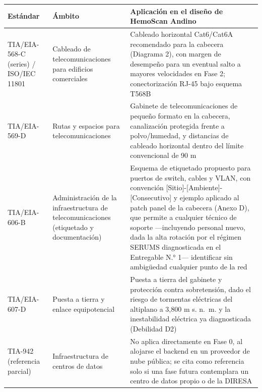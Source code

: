 \documentclass[11pt,a4paper]{article}
\begin{document}
{\small
\begin{longtable}[]{@{}
  >{\raggedright\arraybackslash}p{}
  >{\raggedright\arraybackslash}p{}
  >{\raggedright\arraybackslash}p{}@{}}
\toprule\noalign{}
\begin{minipage}[b]{\linewidth}\raggedright
Estándar
\end{minipage} & \begin{minipage}[b]{\linewidth}\raggedright
Ámbito
\end{minipage} & \begin{minipage}[b]{\linewidth}\raggedright
Aplicación en el diseño de HemoScan Andino
\end{minipage} \\
\midrule\noalign{}
\endhead
\bottomrule\noalign{}
\endlastfoot
TIA/EIA-568-C (series) / ISO/IEC 11801 & Cableado de telecomunicaciones para edificios comerciales & Cableado horizontal Cat6/Cat6A recomendado para la cabecera (Diagrama 2), con margen de desempeño para un eventual salto a mayores velocidades en Fase 2; conectorización RJ-45 bajo esquema T568B \\
TIA/EIA-569-D & Rutas y espacios para telecomunicaciones & Gabinete de telecomunicaciones de pequeño formato en la cabecera, canalización protegida frente a polvo/humedad, y distancias de cableado horizontal dentro del límite convencional de 90 m \\
TIA/EIA-606-B & Administración de la infraestructura de telecomunicaciones (etiquetado y documentación) & Esquema de etiquetado propuesto para puertos de switch, cables y VLAN, con convención {[}Sitio{]}-{[}Ambiente{]}-{[}Consecutivo{]} y ejemplo aplicado al patch panel de la cabecera (Anexo D), que permite a cualquier técnico de soporte ---incluyendo personal nuevo, dada la alta rotación por el régimen SERUMS diagnosticada en el Entregable N.° 1--- identificar sin ambigüedad cualquier punto de la red \\
TIA/EIA-607-D & Puesta a tierra y enlace equipotencial & Puesta a tierra del gabinete y protección contra sobretensión, dado el riesgo de tormentas eléctricas del altiplano a 3,800 m s. n.~m. y la inestabilidad eléctrica ya diagnosticada (Debilidad D2) \\
TIA-942 (referencia parcial) & Infraestructura de centros de datos & No aplica directamente en Fase 0, al alojarse el backend en un proveedor de nube pública; se cita como referencia solo si una fase futura contemplara un centro de datos propio o de la DIRESA \\
\end{longtable}
}
\end{document}
